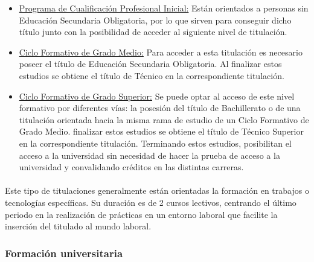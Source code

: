 \documentclass[11pt, a4paper]{report}
\begin{document}
                \begin{itemize}
					
                    \item \underline{Programa de Cualificación Profesional Inicial:} 
                    Están orientados a personas sin Educación Secundaria Obligatoria, por lo que sirven para conseguir dicho título junto con la posibilidad de acceder al siguiente nivel de titulación.
                    
                    \item \underline{Ciclo Formativo de Grado Medio:} 
                    Para acceder a esta titulación es necesario poseer el título de Educación Secundaria Obligatoria. Al finalizar estos estudios se obtiene el título de Técnico en la correspondiente titulación.
                    
                    \item \underline{Ciclo Formativo de Grado Superior:}
                   	Se puede optar al acceso de este nivel formativo por diferentes vías: la posesión del título de Bachillerato o de una titulación orientada hacia la misma rama de estudio de un Ciclo Formativo de Grado Medio. finalizar estos estudios se obtiene el título de Técnico Superior en la correspondiente titulación. Terminando estos estudios, posibilitan el acceso a la universidad sin necesidad de hacer la prueba de acceso a la universidad y convalidando créditos en las distintas carreras.
				
                \end{itemize}

        		\paragraph{}
				Este tipo de titulaciones generalmente están orientadas la formación en trabajos o tecnologías específicas. Su duración es de 2 cursos lectivos, centrando el último periodo en la realización de prácticas en un entorno laboral que facilite la inserción del titulado al mundo laboral.

        	
    		\subsubsection{Formación universitaria}
        		\paragraph{}
    		
\end{document}

